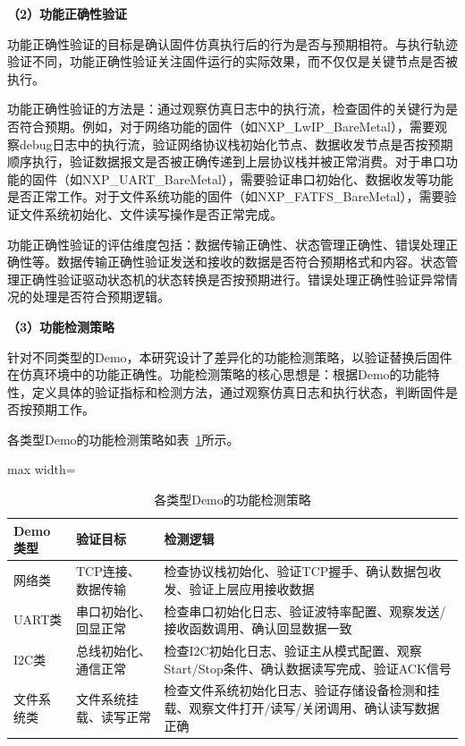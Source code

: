 \textbf{（2）功能正确性验证}

功能正确性验证的目标是确认固件仿真执行后的行为是否与预期相符。与执行轨迹验证不同，功能正确性验证关注固件运行的实际效果，而不仅仅是关键节点是否被执行。

功能正确性验证的方法是：通过观察仿真日志中的执行流，检查固件的关键行为是否符合预期。例如，对于网络功能的固件（如NXP\_LwIP\_BareMetal），需要观察debug日志中的执行流，验证网络协议栈初始化节点、数据收发节点是否按预期顺序执行，验证数据报文是否被正确传递到上层协议栈并被正常消费。对于串口功能的固件（如NXP\_UART\_BareMetal），需要验证串口初始化、数据收发等功能是否正常工作。对于文件系统功能的固件（如NXP\_FATFS\_BareMetal），需要验证文件系统初始化、文件读写操作是否正常完成。

功能正确性验证的评估维度包括：数据传输正确性、状态管理正确性、错误处理正确性等。数据传输正确性验证发送和接收的数据是否符合预期格式和内容。状态管理正确性验证驱动状态机的状态转换是否按预期进行。错误处理正确性验证异常情况的处理是否符合预期逻辑。

\textbf{（3）功能检测策略}

针对不同类型的Demo，本研究设计了差异化的功能检测策略，以验证替换后固件在仿真环境中的功能正确性。功能检测策略的核心思想是：根据Demo的功能特性，定义具体的验证指标和检测方法，通过观察仿真日志和执行状态，判断固件是否按预期工作。

各类型Demo的功能检测策略如表~\ref{tab:function_detection_strategy}所示。

\begin{table}[htbp]
\centering
\caption{各类型Demo的功能检测策略}
\label{tab:function_detection_strategy}
\scriptsize
\begin{adjustbox}{max width=\textwidth}
\begin{tabular}{p{2.5cm}p{3cm}p{5.5cm}}
\toprule
\textbf{Demo 类型} & \textbf{验证目标} & \textbf{检测逻辑} \\
\midrule
网络类 & TCP连接、数据传输 & 检查协议栈初始化、验证TCP握手、确认数据包收发、验证上层应用接收数据 \\
\midrule
UART类 & 串口初始化、回显正常 & 检查串口初始化日志、验证波特率配置、观察发送/接收函数调用、确认回显数据一致 \\
\midrule
I2C类 & 总线初始化、通信正常 & 检查I2C初始化日志、验证主从模式配置、观察Start/Stop条件、确认数据读写完成、验证ACK信号 \\
\midrule
文件系统类 & 文件系统挂载、读写正常 & 检查文件系统初始化日志、验证存储设备检测和挂载、观察文件打开/读写/关闭调用、确认读写数据正确 \\
\bottomrule
\end{tabular}
\end{adjustbox}
\end{table}

